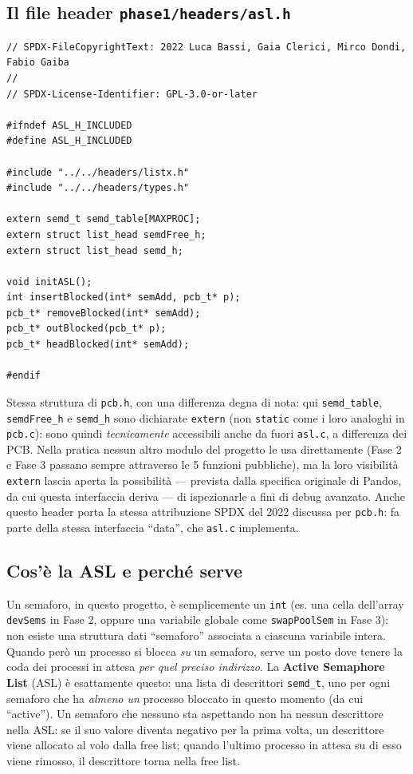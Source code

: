 \documentclass[11pt,a4paper]{article}
\newcommand{\code}[1]{\texttt{#1}}
\begin{document}
\subsection{Il file header \code{phase1/headers/asl.h}}
\begin{lstlisting}
// SPDX-FileCopyrightText: 2022 Luca Bassi, Gaia Clerici, Mirco Dondi, Fabio Gaiba
//
// SPDX-License-Identifier: GPL-3.0-or-later

#ifndef ASL_H_INCLUDED
#define ASL_H_INCLUDED

#include "../../headers/listx.h"
#include "../../headers/types.h"

extern semd_t semd_table[MAXPROC];
extern struct list_head semdFree_h;
extern struct list_head semd_h;

void initASL();
int insertBlocked(int* semAdd, pcb_t* p);
pcb_t* removeBlocked(int* semAdd);
pcb_t* outBlocked(pcb_t* p);
pcb_t* headBlocked(int* semAdd);

#endif
\end{lstlisting}
Stessa struttura di \code{pcb.h}, con una differenza degna di nota: qui
\code{semd\_table}, \code{semdFree\_h} e \code{semd\_h} sono dichiarate
\code{extern} (non \code{static} come i loro analoghi in \code{pcb.c}):
sono quindi \emph{tecnicamente} accessibili anche da fuori
\code{asl.c}, a differenza dei PCB. Nella pratica nessun altro modulo del
progetto le usa direttamente (Fase 2 e Fase 3 passano sempre attraverso le
5 funzioni pubbliche), ma la loro visibilità \code{extern} lascia aperta
la possibilità --- prevista dalla specifica originale di Pandos, da cui
questa interfaccia deriva --- di ispezionarle a fini di debug avanzato.
Anche questo header porta la stessa attribuzione SPDX del 2022 discussa
per \code{pcb.h}: fa parte della stessa interfaccia ``data'', che
\code{asl.c} implementa.

\subsection{Cos'è la ASL e perché serve}
Un semaforo, in questo progetto, è semplicemente un \code{int} (es. una cella
dell'array \code{devSems} in Fase 2, oppure una variabile globale come
\code{swapPoolSem} in Fase 3): non esiste una struttura dati ``semaforo''
associata a ciascuna variabile intera. Quando però un processo si blocca
\emph{su} un semaforo, serve un posto dove tenere la coda dei processi in
attesa \emph{per quel preciso indirizzo}. La \textbf{Active Semaphore List}
(ASL) è esattamente questo: una lista di descrittori \code{semd\_t}, uno per
ogni semaforo che ha \emph{almeno un} processo bloccato in questo momento
(da cui ``active''). Un semaforo che nessuno sta aspettando non ha nessun
descrittore nella ASL: se il suo valore diventa negativo per la prima volta,
un descrittore viene allocato al volo dalla free list; quando l'ultimo
processo in attesa su di esso viene rimosso, il descrittore torna nella free
list.
\end{document}
